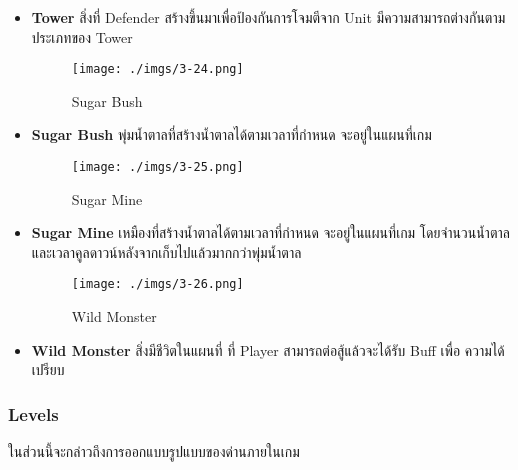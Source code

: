 \documentclass[12pt,oneside,openright,a4paper]{cpe-thai-project}
\begin{document}
\begin{itemize}
  \item \textbf{Tower} สิ่งที่ Defender สร้างขึ้นมาเพื่อป้องกันการโจมตีจาก Unit 				
  มีความสามารถต่างกันตามประเภทของ Tower

  \begin{figure}[H]\centering
    \texttt{[image: ./imgs/3-24.png]}
    \caption{Sugar Bush}\label{fig:3-24}
  \end{figure}
  
  \item \textbf{Sugar Bush} พุ่มน้ำตาลที่สร้างน้ำตาลได้ตามเวลาที่กำหนด จะอยู่ในแผนที่เกม

  \begin{figure}[H]\centering
    \texttt{[image: ./imgs/3-25.png]}
    \caption{Sugar Mine}\label{fig:3-25}
  \end{figure}
  
  \item \textbf{Sugar Mine} เหมืองที่สร้างน้ำตาลได้ตามเวลาที่กำหนด จะอยู่ในแผนที่เกม 
  โดยจำนวนน้ำตาลและเวลาคูลดาวน์หลังจากเก็บไปแล้วมากกว่าพุ่มน้ำตาล

  \begin{figure}[H]\centering
    \texttt{[image: ./imgs/3-26.png]}
    \caption{Wild Monster}\label{fig:3-26}
  \end{figure}

  \item \textbf{Wild Monster} สิ่งมีชีวิตในแผนที่ ที่ Player สามารถต่อสู้แล้วจะได้รับ Buff เพื่อ
  ความได้เปรียบ
\end{itemize}

\subsubsection{Levels}
ในส่วนนี้จะกล่าวถึงการออกแบบรูปแบบของด่านภายในเกม
\end{document}
